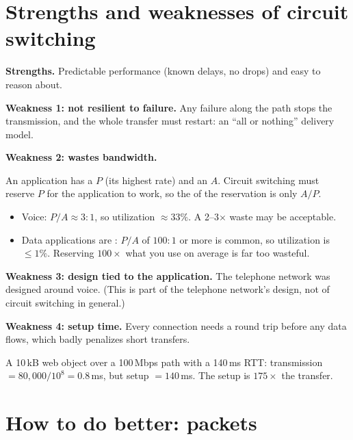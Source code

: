 \section{Strengths and weaknesses of circuit switching}

\textbf{Strengths.} Predictable performance (known delays, no drops) and easy to reason about.

\textbf{Weakness 1: not resilient to failure.} Any failure along the path stops the transmission, and the whole transfer must restart: an ``all or nothing'' delivery model.

\textbf{Weakness 2: wastes bandwidth.}
\begin{defn}
An application has a  $P$ (its highest rate) and an  $A$. Circuit switching must reserve $P$
for the application to work, so the  of the reservation is only $A/P$.
\end{defn}

\begin{example}
\begin{itemize}
  \item Voice: $P/A\approx3{:}1$, so utilization $\approx33\%$. A 2--3$\times$ waste may be acceptable.
  \item Data applications are : $P/A$ of $100{:}1$ or more is common, so utilization is $\le1\%$. Reserving $100\times$ what you use on average is far too wasteful.
\end{itemize}
\end{example}

\textbf{Weakness 3: design tied to the application.} The telephone network was designed around voice. (This is part of the telephone network's design, not of circuit switching in general.)

\textbf{Weakness 4: setup time.} Every connection needs a round trip before any data flows, which badly penalizes short transfers.

\begin{example}
A 10\,kB web object over a 100\,Mbps path with a 140\,ms RTT: transmission $=80{,}000/10^8=0.8$\,ms, but setup $=140$\,ms. The setup is $175\times$ the transfer.
\end{example}

\section{How to do better: packets}

